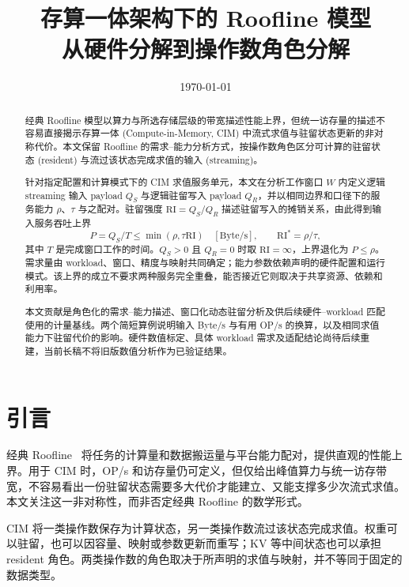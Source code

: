 \documentclass[11pt, a4paper]{ctexart}
\title{\bfseries 存算一体架构下的 Roofline 模型 \\[0.3em]
\large 从硬件分解到操作数角色分解}
\author{}
\date{\today}
\theoremstyle{definition}
\newcommand{\RI}{\mathrm{RI}}
\begin{document}
\maketitle

\begin{abstract}
\noindent
经典 Roofline 模型以算力与所选存储层级的带宽描述性能上界，但统一访存量的描述不容易直接揭示存算一体 (Compute-in-Memory, CIM) 中流式求值与驻留状态更新的非对称代价。本文保留 Roofline 的需求--能力分析方式，按操作数角色区分可计算的驻留状态 (resident) 与流过该状态完成求值的输入 (streaming)。

针对指定配置和计算模式下的 CIM 求值服务单元，本文在分析工作窗口 $W$ 内定义逻辑 streaming 输入 payload $Q_S$ 与逻辑驻留写入 payload $Q_R$，并以相同边界和口径下的服务能力 $\rho$、$\tau$ 与之配对。驻留强度 $\RI=Q_S/Q_R$ 描述驻留写入的摊销关系，由此得到输入服务吞吐上界
\[
P=Q_S/T\le\min(\rho,\tau\RI)\quad[\mathrm{Byte}/\mathrm{s}],
\qquad \RI^*=\rho/\tau,
\]
其中 $T$ 是完成窗口工作的时间。$Q_S>0$ 且 $Q_R=0$ 时取 $\RI=\infty$，上界退化为 $P\le\rho$。需求量由 workload、窗口、精度与映射共同确定；能力参数依赖声明的硬件配置和运行模式。该上界的成立不要求两种服务完全重叠，能否接近它则取决于共享资源、依赖和利用率。

本文贡献是角色化的需求--能力描述、窗口化动态驻留分析及供后续硬件--workload 匹配使用的计量基线。两个简短算例说明输入 Byte/s 与有用 OP/s 的换算，以及相同求值能力下驻留代价的影响。硬件数值标定、具体 workload 需求及适配结论尚待后续重建，当前长稿不将旧版数值分析作为已验证结果。
\end{abstract}
\newpage

\section{引言}
\label{sec:intro}

经典 Roofline~\cite{williams2009roofline} 将任务的计算量和数据搬运量与平台能力配对，提供直观的性能上界。用于 CIM 时，OP/s 和访存量仍可定义，但仅给出峰值算力与统一访存带宽，不容易看出一份驻留状态需要多大代价才能建立、又能支撑多少次流式求值。本文关注这一非对称性，而非否定经典 Roofline 的数学形式。

CIM 将一类操作数保存为计算状态，另一类操作数流过该状态完成求值。权重可以驻留，也可以因容量、映射或参数更新而重写；KV 等中间状态也可以承担 resident 角色。两类操作数的角色取决于所声明的求值与映射，并不等同于固定的数据类型。
\end{document}
